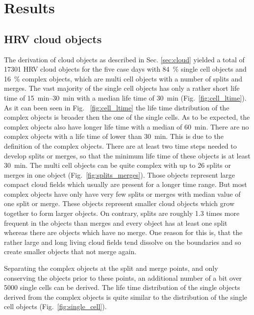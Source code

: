 \chapter{Results}

\section{HRV cloud objects}
The derivation of cloud objects as described in Sec. \ref{sec:cloud} yielded a total of \num{17301} HRV cloud objects for the five case days with \SI{84}{\percent} single cell objects and \SI{16}{\percent} complex objects, which are multi cell objects with a number of splits and merges. The vast majority of the single cell objects has only a rather short life time of \SIrange{15}{30}{\minute} with a median life time of \SI{30}{\minute} (Fig.~\ref{fig:cell_ltime}). As it can been seen in Fig.~ \ref{fig:cell_ltime} the life time distribution of the complex objects is broader then the one of the single cells. As to be expected, the complex objects also have longer life time with a median of \SI{60}{\minute}. There are no complex objects with a life time of lower than \SI{30}{\minute}. This is due to the definition of the complex objects. There are at least two time steps needed to develop splits or merges, so that the minimum life time of these objects is at least \SI{30}{\minute}. The multi cell objects can be quite complex with up to \num{26} splits or merges in one object (Fig.~\ref{fig:splits_merges}). Those objects represent large compact cloud fields which usually are present for a longer time range. But most complex objects have only have very few splits or merges with median value of one split or merge. These objects represent smaller cloud objects which grow together to form larger objects. On contrary, splits are roughly \num{1.3} times more frequent in the objects than merges and every object has at least one split whereas there are objects which have no merge. One reason for this is, that the rather large and long living cloud fields tend dissolve on the boundaries and so create smaller objects that not merge again.

Separating the complex objects at the split and merge points, and only conserving the objects prior to these points, an additional number of a bit over \num{5000} single cells can be derived. The life time distribution of the single objects derived from the complex objects is quite similar to the distribution of the single cell objects (Fig.~\ref{fig:single_cell}).

